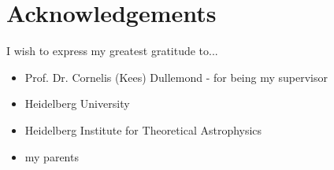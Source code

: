 \cleardoublepage
\chapter*{Acknowledgements}

\thispagestyle{NoHeader}

I wish to express my greatest gratitude to...
\begin{itemize}
    \item Prof. Dr. Cornelis (Kees) Dullemond
        - for being my supervisor
    \item Heidelberg University
    \item Heidelberg Institute for Theoretical Astrophysics
    \item my parents 
\end{itemize}
